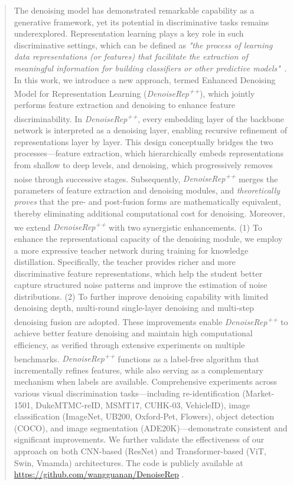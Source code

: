 \documentclass[conference]{IEEEtran}
\begin{document}
\begin{abstract}
The denoising model has demonstrated remarkable capability as a generative framework, yet its potential in discriminative tasks remains underexplored.
%
Representation learning plays a key role in such discriminative settings, which can be defined as \textit{"the process of learning data representations (or features) that facilitate the extraction of meaningful information for building classifiers or other predictive models"}~\cite{6472238}.
%
In this work, we introduce a new approach, termed Enhanced Denoising Model for Representation Learning (\textit{DenoiseRep\textsuperscript{++}}), which jointly performs feature extraction and denoising to enhance feature discriminability.
%
In \textit{DenoiseRep\textsuperscript{++}}, every embedding layer of the backbone network is interpreted as a denoising layer, enabling recursive refinement of representations layer by layer. This design conceptually bridges the two processes—feature extraction, which hierarchically embeds representations from shallow to deep levels, and denoising, which progressively removes noise through successive stages.
%
Subsequently, \textit{DenoiseRep\textsuperscript{++}} merges the parameters of feature extraction and denoising modules, and \textit{theoretically proves} that the pre- and post-fusion forms are mathematically equivalent, thereby eliminating additional computational cost for denoising.
%
Moreover, we extend \textit{DenoiseRep\textsuperscript{++}} with two synergistic enhancements. (1) To enhance the representational capacity of the denoising module, we employ a more expressive teacher network during training for
knowledge distillation. Specifically, the teacher provides richer
and more discriminative feature representations, which help the
student better capture structured noise patterns and improve the
estimation of noise distributions. (2) To further improve denoising capability with limited denoising depth, multi-round single-layer denoising and multi-step denoising fusion are adopted. These improvements enable \textit{DenoiseRep\textsuperscript{++}} to achieve better feature denoising and maintain high computational efficiency, as verified through extensive experiments on multiple benchmarks.
%
\textit{DenoiseRep\textsuperscript{++}} functions as a label-free algorithm that incrementally refines features, while also serving as a complementary mechanism when labels are available.
%
Comprehensive experiments across various visual discrimination tasks—including re-identification (Market-1501, DukeMTMC-reID, MSMT17, CUHK-03, VehicleID), image classification (ImageNet, UB200, Oxford-Pet, Flowers), object detection (COCO), and image segmentation (ADE20K)—demonstrate consistent and significant improvements. We further validate the effectiveness of our approach on both CNN-based (ResNet) and Transformer-based (ViT, Swin, Vmamda) architectures.
%
The code is publicly available at \href{https://github.com/wangguanan/DenoiseRep}{https://github.com/wangguanan/DenoiseRep}
.
\end{abstract}
\end{document}
